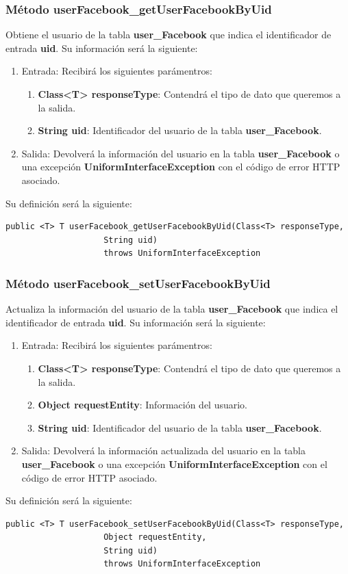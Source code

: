 \subsubsection{Método userFacebook\_getUserFacebookByUid}
Obtiene el usuario de la tabla \textbf{user\_Facebook} que indica el identificador de entrada \textbf{uid}. Su información será la siguiente:
\begin{enumerate}
\item Entrada: Recibirá los siguientes parámentros:
\begin{enumerate}
\item \textbf{Class<T> responseType}: Contendrá el tipo de dato que queremos a la salida. 
\item \textbf{String uid}: Identificador del usuario de la tabla \textbf{user\_Facebook}.
\end{enumerate}
\item Salida: Devolverá la información del usuario en la tabla \textbf{user\_Facebook} o una excepción \textbf{UniformInterfaceException} con el código de error HTTP asociado.
\end{enumerate}
\bigskip
\par
Su definición será la siguiente:
\begin{verbatim}public <T> T userFacebook_getUserFacebookByUid(Class<T> responseType, 
					String uid) 
					throws UniformInterfaceException\end{verbatim}

\subsubsection{Método userFacebook\_setUserFacebookByUid}
Actualiza la información del usuario de la tabla \textbf{user\_Facebook} que indica el identificador de entrada \textbf{uid}. Su información será la siguiente:
\begin{enumerate}
\item Entrada: Recibirá los siguientes parámentros:
\begin{enumerate}
\item \textbf{Class<T> responseType}: Contendrá el tipo de dato que queremos a la salida. 
\item \textbf{Object requestEntity}: Información del usuario.
\item \textbf{String uid}: Identificador del usuario de la tabla \textbf{user\_Facebook}.
\end{enumerate}
\item Salida: Devolverá la información actualizada del usuario en la tabla \textbf{user\_Facebook} o una excepción \textbf{UniformInterfaceException} con el código de error HTTP asociado.
\end{enumerate}
\bigskip
\par
Su definición será la siguiente:
\begin{verbatim}public <T> T userFacebook_setUserFacebookByUid(Class<T> responseType, 
					Object requestEntity, 
					String uid) 
					throws UniformInterfaceException\end{verbatim}

